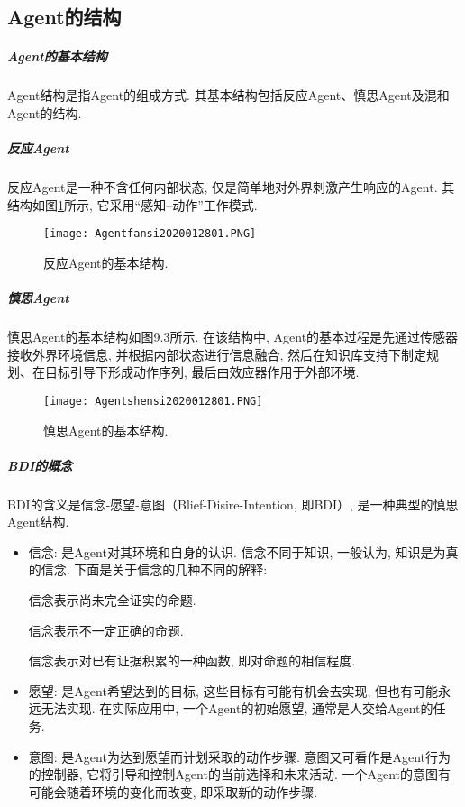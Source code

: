 \subsection{Agent的结构}
\subparagraph{Agent的基本结构}

Agent结构是指Agent的组成方式. 其基本结构包括反应Agent、慎思Agent及混和Agent的结构.
\subparagraph{反应Agent}

    反应Agent是一种不含任何内部状态, 仅是简单地对外界刺激产生响应的Agent. 其结构如图\ref{Agentfansi2020012801}所示, 它采用“感知--动作”工作模式.
\begin{figure}[H]
\centering
  \texttt{[image: Agentfansi2020012801.PNG]}
  \caption{反应Agent的基本结构.}
  \label{Agentfansi2020012801}
\end{figure}    
    
\subparagraph{慎思Agent}

慎思Agent的基本结构如图9.3所示. 在该结构中, Agent的基本过程是先通过传感器接收外界环境信息, 并根据内部状态进行信息融合, 然后在知识库支持下制定规划、在目标引导下形成动作序列, 最后由效应器作用于外部环境.
\begin{figure}[H]
\centering
  \texttt{[image: Agentshensi2020012801.PNG]}
  \caption{慎思Agent的基本结构.}
  \label{Agentshensi2020012801}
\end{figure} 
\subparagraph{BDI的概念}
BDI的含义是信念-愿望-意图（Blief-Disire-Intention, 即BDI）, 是一种典型的慎思Agent结构.

\begin{itemize}
\item 信念: 是Agent对其环境和自身的认识. 信念不同于知识, 一般认为, 知识是为真的信念. 下面是关于信念的几种不同的解释:

     信念表示尚未完全证实的命题.

     信念表示不一定正确的命题.

     信念表示对已有证据积累的一种函数, 即对命题的相信程度.

\item 愿望: 是Agent希望达到的目标, 这些目标有可能有机会去实现, 但也有可能永远无法实现. 在实际应用中, 一个Agent的初始愿望, 通常是人交给Agent的任务.
\item 意图: 是Agent为达到愿望而计划采取的动作步骤. 意图又可看作是Agent行为的控制器, 它将引导和控制Agent的当前选择和未来活动. 一个Agent的意图有可能会随着环境的变化而改变, 即采取新的动作步骤.
\end{itemize}
